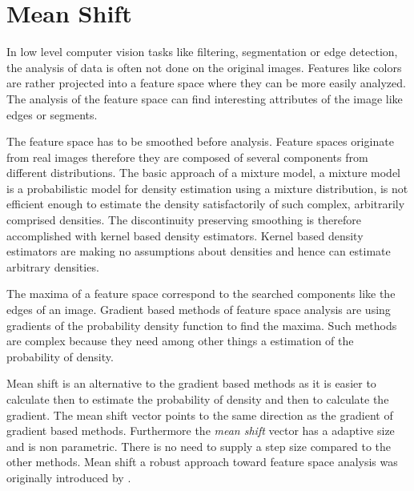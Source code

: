 \chapter{Mean Shift}\label{ch:mean_shift}
In low level computer vision tasks like filtering, segmentation or
edge detection, the analysis of data is often not done on the original
images.  Features like colors are rather projected into a feature
space where they can be more easily analyzed. The analysis of the
feature space can find interesting attributes of the image like edges
or segments.

The feature space has to be smoothed before analysis. Feature spaces
originate from real images therefore they are composed of several
components from different distributions. The basic approach of a
mixture model, a mixture model is a probabilistic model for density
estimation using a mixture distribution, is not efficient enough to
estimate the density satisfactorily of such complex, arbitrarily
comprised densities. The discontinuity preserving smoothing is
therefore accomplished with kernel based density estimators. Kernel
based density estimators are making no assumptions about densities and
hence can estimate arbitrary densities.

The maxima of a feature space correspond to the searched components
like the edges of an image. Gradient based methods of feature space
analysis are using gradients of the probability density function to
find the maxima. Such methods are complex because they need among
other things a estimation of the probability of density.

Mean shift is an alternative to the gradient based methods as it is
easier to calculate then to estimate the probability of density and
then to calculate the gradient. The mean shift vector points to the
same direction as the gradient of gradient based methods. Furthermore
the \emph{mean shift} vector has a adaptive size and is non
parametric. There is no need to supply a step size compared to the
other methods. Mean shift a robust approach toward feature space
analysis was originally introduced by \citeauthor{citeulike:462300}
\citep{citeulike:462300}.

